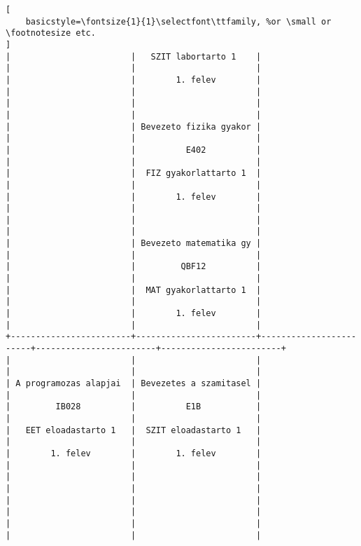 \begin{lstlisting}[
    basicstyle=\fontsize{1}{1}\selectfont\ttfamily, %or \small or \footnotesize etc.
]
|                        |   SZIT labortarto 1    |                        |                        |                        | 
|                        |        1. felev        |                        |                        |                        | 
|                        |                        |                        |                        |                        | 
|                        | Bevezeto fizika gyakor |                        |                        |                        | 
|                        |          E402          |                        |                        |                        | 
|                        |  FIZ gyakorlattarto 1  |                        |                        |                        | 
|                        |        1. felev        |                        |                        |                        | 
|                        |                        |                        |                        |                        | 
|                        | Bevezeto matematika gy |                        |                        |                        | 
|                        |         QBF12          |                        |                        |                        | 
|                        |  MAT gyakorlattarto 1  |                        |                        |                        | 
|                        |        1. felev        |                        |                        |                        | 
+------------------------+------------------------+------------------------+------------------------+------------------------+
|                        |                        |                        |                        |                        | 
| A programozas alapjai  | Bevezetes a szamitasel |                        |                        |                        | 
|         IB028          |          E1B           |                        |                        |                        | 
|   EET eloadastarto 1   |  SZIT eloadastarto 1   |                        |                        |                        | 
|        1. felev        |        1. felev        |                        |                        |                        | 
|                        |                        |                        |                        |                        | 
|                        |                        |                        |                        |                        | 
|                        |                        |                        |                        |                        | 

\end{lstlisting}
